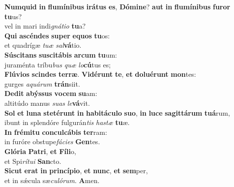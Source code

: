 \evenverse \textbf{Num}\textbf{quid} \textbf{in} \textbf{flu}\textbf{mí}\textbf{ni}\textbf{bus} \textbf{i}\textbf{rá}\textbf{tus} \textbf{es}, \textbf{Dó}\textbf{mi}\textbf{ne}? \textbf{aut} \textbf{in} \textbf{flu}\textbf{mí}\textbf{ni}\textbf{bus} \textbf{fu}\textbf{ror} \textbf{tu}us?~\*\\
\evenverse vel in mari indi\textit{gná}\textit{ti}\textit{o} \textbf{tu}a?\\
\oddverse \textbf{Qui} \textbf{a}\textbf{scén}\textbf{des} \textbf{su}\textbf{per} \textbf{e}\textbf{quos} \textbf{tu}os:~\*\\
\oddverse et quadrígæ \textit{tu}\textit{æ} \textit{sal}\textbf{vá}tio.\\
\evenverse \textbf{Sú}\textbf{sci}\textbf{tans} \textbf{su}\textbf{sci}\textbf{tá}\textbf{bis} \textbf{ar}\textbf{cum} \textbf{tu}um:~\*\\
\evenverse juraménta tríbu\textit{bus} \textit{quæ} \textit{lo}\textbf{cú}tus es;\\
\oddverse \textbf{Flú}\textbf{vi}\textbf{os} \textbf{scin}\textbf{des} \textbf{ter}\textbf{ræ}. \textbf{Vi}\textbf{dé}\textbf{runt} \textbf{te}, \textbf{et} \textbf{do}\textbf{lu}\textbf{é}\textbf{runt} \textbf{mon}tes:~\*\\
\oddverse gurges \textit{a}\textit{quá}\textit{rum} \textbf{trán}siit.\\
\evenverse \textbf{De}\textbf{dit} \textbf{a}\textbf{býs}\textbf{sus} \textbf{vo}\textbf{cem} \textbf{su}am:~\*\\
\evenverse altitúdo manus \textit{su}\textit{as} \textit{le}\textbf{vá}vit.\\
\oddverse \textbf{Sol} \textbf{et} \textbf{lu}\textbf{na} \textbf{ste}\textbf{té}\textbf{runt} \textbf{in} \textbf{ha}\textbf{bi}\textbf{tá}\textbf{cu}\textbf{lo} \textbf{su}\textbf{o}, \textbf{in} \textbf{lu}\textbf{ce} \textbf{sa}\textbf{git}\textbf{tá}\textbf{rum} \textbf{tu}\textbf{á}rum,~\*\\
\oddverse ibunt in splendóre fulgurán\textit{tis} \textit{ha}\textit{stæ} \textbf{tu}æ.\\
\evenverse \textbf{In} \textbf{fré}\textbf{mi}\textbf{tu} \textbf{con}\textbf{cul}\textbf{cá}\textbf{bis} \textbf{ter}ram:~\*\\
\evenverse in furóre obstupe\textit{fá}\textit{ci}\textit{es} \textbf{Gen}tes.\\
\oddverse \textbf{Gló}\textbf{ri}\textbf{a} \textbf{Pa}\textbf{tri}, \textbf{et} \textbf{Fí}\textbf{li}o,~\*\\
\oddverse et Spi\textit{rí}\textit{tu}\textit{i} \textbf{San}cto.\\
\evenverse \textbf{Si}\textbf{cut} \textbf{e}\textbf{rat} \textbf{in} \textbf{prin}\textbf{cí}\textbf{pi}\textbf{o}, \textbf{et} \textbf{nunc}, \textbf{et} \textbf{sem}per,~\*\\
\evenverse et in sǽcula sæ\textit{cu}\textit{ló}\textit{rum}. \textbf{A}men.\\
